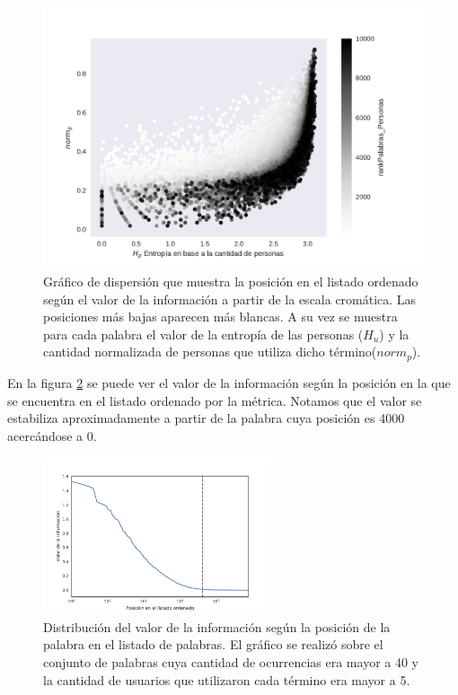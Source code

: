 \begin{figure}[ht]
\centering
\includegraphics[width=1.0\textwidth]{./images/entropiaPersonasxNormCantPersonas.pdf}
\caption{Gráfico de dispersión que muestra la posición en el listado ordenado según el valor de la información a partir de la escala cromática. Las posiciones más bajas aparecen más blancas. A su vez se muestra para cada palabra el valor de la entropía de las personas ($H_u$) y la cantidad normalizada de personas que utiliza dicho término($norm_p$). } 
\label{fig:infoValue} 
\end{figure}

En la figura \ref{fig:ivalue} se puede ver el valor de la información según la posición en la que se encuentra en el listado ordenado por la métrica. Notamos que el valor se estabiliza aproximadamente a partir de la palabra cuya posición es 4000 acercándose a 0.


\begin{figure}[ht]
\centering
\includegraphics[width=0.6\textwidth]{./images/train/conFiltro/valorInformacionCorte.pdf}
\caption{Distribución del valor de la información según la posición de la palabra en el listado de palabras. El gráfico se realizó sobre el conjunto de palabras cuya cantidad de ocurrencias era mayor a 40 y la cantidad de usuarios que utilizaron cada término era mayor a 5. } 
\label{fig:ivalue}
\end{figure}


